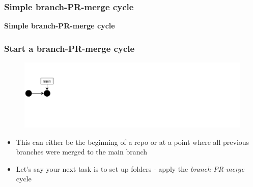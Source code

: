 \documentclass[aspectratio=169]{beamer} %
\begin{document}
\begin{frame}
	\frametitle{Simple branch-PR-merge cycle}

	\huge\centering \textbf{Simple branch-PR-merge cycle}

\end{frame}


\begin{frame}
	\frametitle{Start a branch-PR-merge cycle}

	\vspace{-.5cm}
	\begin{minipage}[t][5cm][t]{\textwidth}
		\begin{figure}
			\centering
			\includegraphics[width=\textwidth]{./img/dime-gitflow-network-0.png}
		\end{figure}
	\end{minipage}

	\vspace{-.5cm}
	\begin{minipage}[t][5cm][t]{\textwidth}
		\begin{itemize}
			\setlength\itemsep{.5em}
			\item This can either be the beginning of a repo or at a point where all previous branches were merged to the main branch
			\item Let's say your next task is to set up folders - apply the \textit{branch-PR-merge} cycle
		\end{itemize}
	\end{minipage}

\end{frame}
\end{document}
